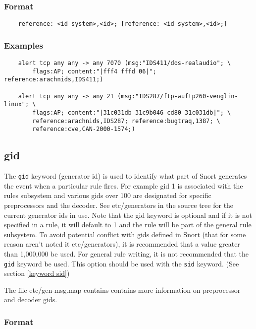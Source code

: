 \documentclass[english]{report}
\begin{document}
\subsubsection{Format}

\begin{verbatim}
    reference: <id system>,<id>; [reference: <id system>,<id>;]
\end{verbatim}

\subsubsection{Examples}

\begin{verbatim}
    alert tcp any any -> any 7070 (msg:"IDS411/dos-realaudio"; \
        flags:AP; content:"|fff4 fffd 06|"; reference:arachnids,IDS411;)
    
    alert tcp any any -> any 21 (msg:"IDS287/ftp-wuftp260-venglin-linux"; \
        flags:AP; content:"|31c031db 31c9b046 cd80 31c031db|"; \
        reference:arachnids,IDS287; reference:bugtraq,1387; \
        reference:cve,CAN-2000-1574;)
\end{verbatim}

\subsection{gid}
\label{keyword gid}

The \texttt{gid} keyword (generator id) is used to identify what part of Snort
generates the event when a particular rule fires.  For example gid 1 is
associated with the rules subsystem and various gids over 100 are designated
for specific preprocessors and the decoder.  See etc/generators in the source
tree for the current generator ids in use.  Note that the gid keyword is
optional and if it is not specified in a rule, it will default to 1 and the
rule will be part of the general rule subsystem.  To avoid potential conflict
with gids defined in Snort (that for some reason aren't noted it
etc/generators), it is recommended that a value greater than 1,000,000 be used.
For general rule writing, it is not recommended that the \texttt{gid} keyword
be used.  This option should be used with the \texttt{sid} keyword.  (See
section \ref{keyword sid})

The file etc/gen-msg.map contains contains more information on preprocessor and
decoder gids.

\subsubsection{Format}
\end{document}
